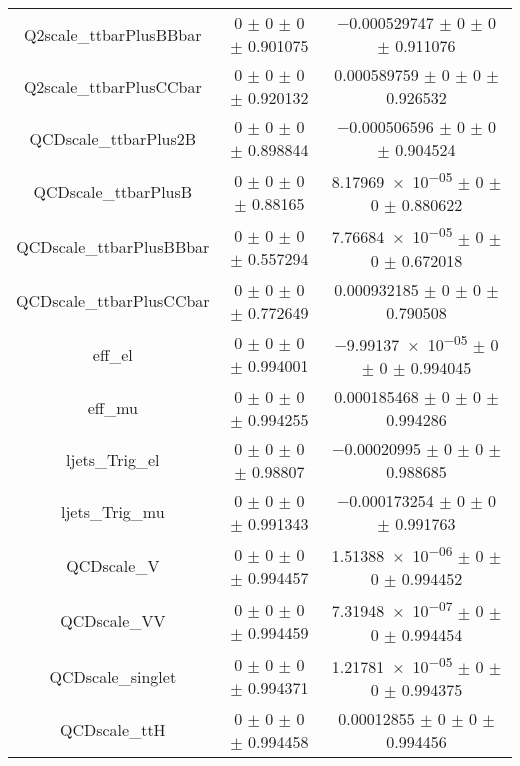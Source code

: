 \begin{table}
\begin{tabular}{ccc}
Q2scale\_ttbarPlusBBbar & \num{0} $\pm$ \num{0} $\pm$ \num{0} $\pm$ \num{0.901075} & \num{-0.000529747} $\pm$ \num{0} $\pm$ \num{0} $\pm$ \num{0.911076}\\
Q2scale\_ttbarPlusCCbar & \num{0} $\pm$ \num{0} $\pm$ \num{0} $\pm$ \num{0.920132} & \num{0.000589759} $\pm$ \num{0} $\pm$ \num{0} $\pm$ \num{0.926532}\\
QCDscale\_ttbarPlus2B & \num{0} $\pm$ \num{0} $\pm$ \num{0} $\pm$ \num{0.898844} & \num{-0.000506596} $\pm$ \num{0} $\pm$ \num{0} $\pm$ \num{0.904524}\\
QCDscale\_ttbarPlusB & \num{0} $\pm$ \num{0} $\pm$ \num{0} $\pm$ \num{0.88165} & \num{8.17969e-05} $\pm$ \num{0} $\pm$ \num{0} $\pm$ \num{0.880622}\\
QCDscale\_ttbarPlusBBbar & \num{0} $\pm$ \num{0} $\pm$ \num{0} $\pm$ \num{0.557294} & \num{7.76684e-05} $\pm$ \num{0} $\pm$ \num{0} $\pm$ \num{0.672018}\\
QCDscale\_ttbarPlusCCbar & \num{0} $\pm$ \num{0} $\pm$ \num{0} $\pm$ \num{0.772649} & \num{0.000932185} $\pm$ \num{0} $\pm$ \num{0} $\pm$ \num{0.790508}\\
eff\_el & \num{0} $\pm$ \num{0} $\pm$ \num{0} $\pm$ \num{0.994001} & \num{-9.99137e-05} $\pm$ \num{0} $\pm$ \num{0} $\pm$ \num{0.994045}\\
eff\_mu & \num{0} $\pm$ \num{0} $\pm$ \num{0} $\pm$ \num{0.994255} & \num{0.000185468} $\pm$ \num{0} $\pm$ \num{0} $\pm$ \num{0.994286}\\
ljets\_Trig\_el & \num{0} $\pm$ \num{0} $\pm$ \num{0} $\pm$ \num{0.98807} & \num{-0.00020995} $\pm$ \num{0} $\pm$ \num{0} $\pm$ \num{0.988685}\\
ljets\_Trig\_mu & \num{0} $\pm$ \num{0} $\pm$ \num{0} $\pm$ \num{0.991343} & \num{-0.000173254} $\pm$ \num{0} $\pm$ \num{0} $\pm$ \num{0.991763}\\
QCDscale\_V & \num{0} $\pm$ \num{0} $\pm$ \num{0} $\pm$ \num{0.994457} & \num{1.51388e-06} $\pm$ \num{0} $\pm$ \num{0} $\pm$ \num{0.994452}\\
QCDscale\_VV & \num{0} $\pm$ \num{0} $\pm$ \num{0} $\pm$ \num{0.994459} & \num{7.31948e-07} $\pm$ \num{0} $\pm$ \num{0} $\pm$ \num{0.994454}\\
QCDscale\_singlet & \num{0} $\pm$ \num{0} $\pm$ \num{0} $\pm$ \num{0.994371} & \num{1.21781e-05} $\pm$ \num{0} $\pm$ \num{0} $\pm$ \num{0.994375}\\
QCDscale\_ttH & \num{0} $\pm$ \num{0} $\pm$ \num{0} $\pm$ \num{0.994458} & \num{0.00012855} $\pm$ \num{0} $\pm$ \num{0} $\pm$ \num{0.994456}\\

\end{tabular}
\end{table}
